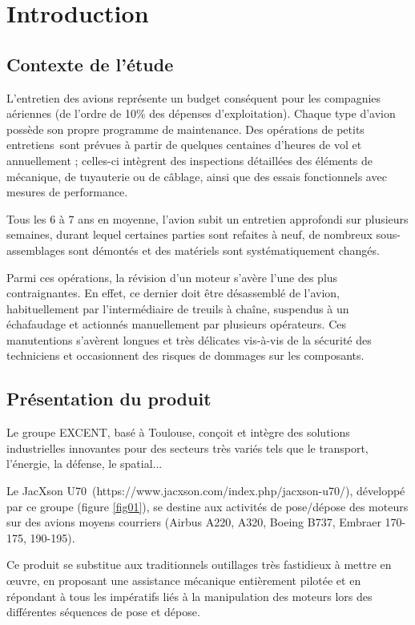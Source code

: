 

\section{Introduction}

\subsection{Contexte de l'étude}

L'entretien des avions représente un budget conséquent pour les compagnies aériennes (de l'ordre de 10\% des dépenses d'exploitation). Chaque type d'avion possède son propre programme de maintenance. Des opérations de \og petits entretiens\fg\ sont prévues à partir de quelques centaines d'heures de vol et annuellement ; celles-ci intègrent des inspections détaillées des éléments de
mécanique, de tuyauterie ou de câblage, ainsi que des essais fonctionnels avec mesures de performance.

Tous les 6 à 7 ans en moyenne, l'avion subit un entretien approfondi sur plusieurs semaines, durant lequel certaines parties sont refaites à neuf, de nombreux sous-assemblages sont démontés et des matériels sont systématiquement changés.

Parmi ces opérations, la révision d'un moteur s'avère l'une des plus contraignantes. En effet, ce dernier doit être désassemblé de l'avion, habituellement par l'intermédiaire de treuils à chaîne, suspendus à un échafaudage et actionnés manuellement par plusieurs opérateurs. Ces manutentions s'avèrent longues et très délicates vis-à-vis de la sécurité des techniciens et
occasionnent des risques de dommages sur les composants.

\subsection{Présentation du produit}

Le groupe EXCENT, basé à Toulouse, conçoit et intègre des solutions industrielles innovantes pour des secteurs très variés tels que le transport, l'énergie, la défense, le spatial...

Le \og JacXson U70\fg\ (https://www.jacxson.com/index.php/jacxson-u70/), développé par ce groupe (figure \ref{fig01}), se destine aux activités de pose/dépose des moteurs sur des avions moyens courriers (Airbus A220, A320, Boeing B737, Embraer 170-175, 190-195).

Ce produit se substitue aux traditionnels outillages très fastidieux à mettre en \oe uvre, en proposant une assistance mécanique entièrement pilotée et en répondant à tous les impératifs liés à la manipulation des moteurs lors des différentes séquences de pose et dépose.


